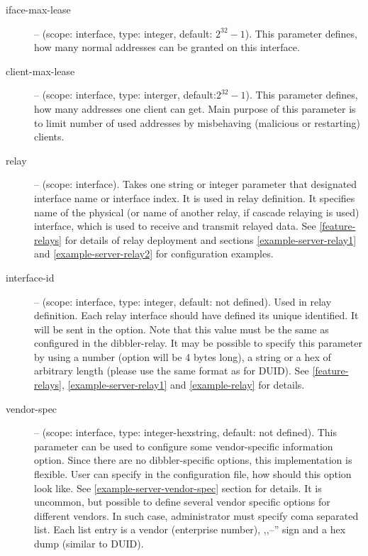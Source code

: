 \begin{description}
\item[iface-max-lease] -- (scope: interface, type: integer, default:
            $2^{32}-1$). This parameter defines, how many normal
            addresses can be granted on this interface.

\item[client-max-lease] -- (scope: interface, type: interger,
            default:$2^{32}-1$). This parameter defines, how many
            addresses one client can get. Main purpose of this
            parameter is to limit number of used addresses by
            misbehaving (malicious or restarting) clients.

\item[relay] -- (scope: interface). Takes one string or integer
  parameter that designated interface name or interface index. It is
  used in relay definition.  It specifies name of the physical (or
  name of another relay, if cascade relaying is used) interface, which
  is used to receive and transmit relayed data. See
  \ref{feature-relays} for details of relay deployment and sections
  \ref{example-server-relay1} and \ref{example-server-relay2} for
  configuration examples.

\item[interface-id] -- (scope: interface, type: integer, default: not
  defined). Used in relay definition. Each relay interface should have
  defined its unique identified. It will be sent in the
   option. Note that this value must be the same as
  configured in the dibbler-relay. It may be possible to specify this
  parameter by using a number (option will be 4 bytes long), a string
  or a hex of arbitrary length (please use the same format as for
  DUID). See \ref{feature-relays}, \ref{example-server-relay1} and
  \ref{example-relay} for details.

 \item[vendor-spec] -- (scope: interface, type: integer-hexstring,
   default: not defined). This parameter can be used to configure some
   vendor-specific information option. Since there are no
   dibbler-specific options, this implementation is flexible. User can
   specify in the configuration file, how should this option look
   like. See \ref{example-server-vendor-spec} section for details. It
   is uncommon, but possible to define several vendor specific options
   for different vendors. In such case, administrator must specify
   coma separated list. Each list entry is a vendor (enterprise
   number), ,,--'' sign and a hex dump (similar to DUID).


\end{description}
